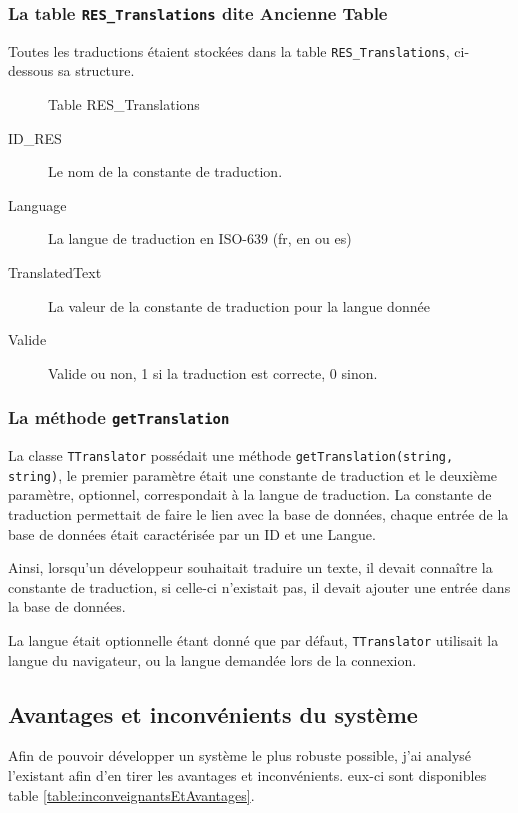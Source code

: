 \subsubsection{La table \texttt{RES\_Translations} dite Ancienne Table}
Toutes les traductions étaient stockées dans la table \texttt{RES\_Translations}, ci-dessous sa structure.
\begin{figure}[H]
\centering

\caption{Table RES\_Translations}
\end{figure}
\begin{description}
	\item[ID\_RES]  Le nom de la constante de traduction.
	\item[Language] La langue de traduction en ISO-639 (fr, en ou es)
	\item[TranslatedText] La valeur de la constante de traduction pour la langue donnée
	\item[Valide] Valide ou non, 1 si la traduction est correcte, 0 sinon.
\end{description}

\subsubsection{La méthode \texttt{getTranslation}}
	La classe \texttt{TTranslator} possédait une méthode \texttt{getTranslation(string, string)}, le premier paramètre était une constante de traduction et le deuxième paramètre, optionnel, correspondait à la langue de traduction.
La constante de traduction permettait de faire le lien avec la base de données, chaque entrée de la base de données était caractérisée par un ID et une Langue.

Ainsi, lorsqu'un développeur souhaitait traduire un texte, il devait connaître la constante de traduction, si celle-ci n'existait pas, il devait ajouter une entrée dans la base de données.



La langue était optionnelle étant donné que par défaut,  \texttt{TTranslator} utilisait la langue du navigateur, ou la langue demandée lors de la connexion.

\subsection{Avantages et inconvénients du système}
Afin de pouvoir développer un système le plus robuste possible, j'ai analysé l'existant afin d'en tirer les avantages et inconvénients. eux-ci sont disponibles table \ref{table:inconveignantsEtAvantages}.


